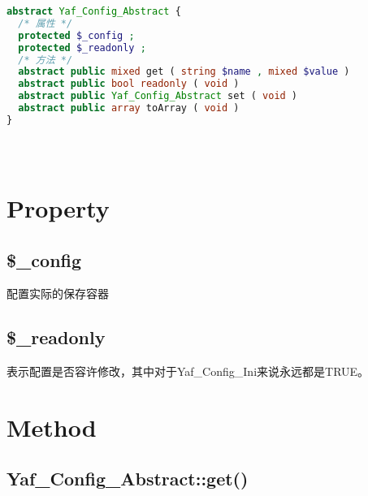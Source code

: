 \begin{lstlisting}[language=PHP]
abstract Yaf_Config_Abstract {
  /* 属性 */
  protected $_config ;
  protected $_readonly ;
  /* 方法 */
  abstract public mixed get ( string $name , mixed $value )
  abstract public bool readonly ( void )
  abstract public Yaf_Config_Abstract set ( void )
  abstract public array toArray ( void )
}
\end{lstlisting}















\begin{lstlisting}[language=PHP]

\end{lstlisting}



\begin{lstlisting}[language=PHP]

\end{lstlisting}



\begin{lstlisting}[language=PHP]

\end{lstlisting}

\section{Property}


\subsection{\$\_config}

配置实际的保存容器


\subsection{\$\_readonly}

表示配置是否容许修改，其中对于Yaf\_Config\_Ini来说永远都是TRUE。

\section{Method}


\subsection{Yaf\_Config\_Abstract::get()}


